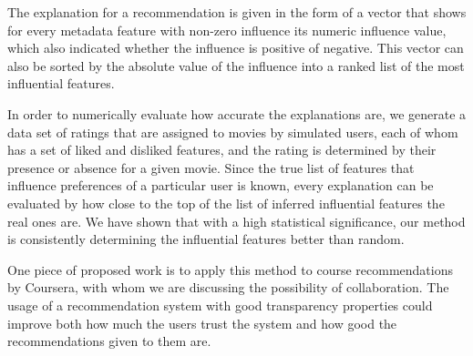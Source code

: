 The explanation for a recommendation is given in the form of a vector that shows
for every metadata feature with non-zero influence its numeric influence
value, which also indicated whether the influence is positive of negative. This
vector can also be sorted by the absolute value of the influence into a ranked
list of the most influential features.

In order to numerically evaluate how accurate the explanations are, we generate
a data set of ratings that are assigned to movies by simulated users, each of
whom has a set of liked and disliked features, and the rating is determined by
their presence or absence for a given movie. Since the true list of features
that influence preferences of a particular user is known, every explanation can
be evaluated by how close to the top of the list of inferred influential
features the real ones are. We have shown that with a high statistical
significance, our method is consistently determining the influential features
better than random.

One piece of proposed work is to apply this method to course recommendations by
Coursera, with whom we are discussing the possibility of collaboration. The
usage of a recommendation system with good transparency properties could improve
both how much the users trust the system and how good the recommendations
given to them are.
